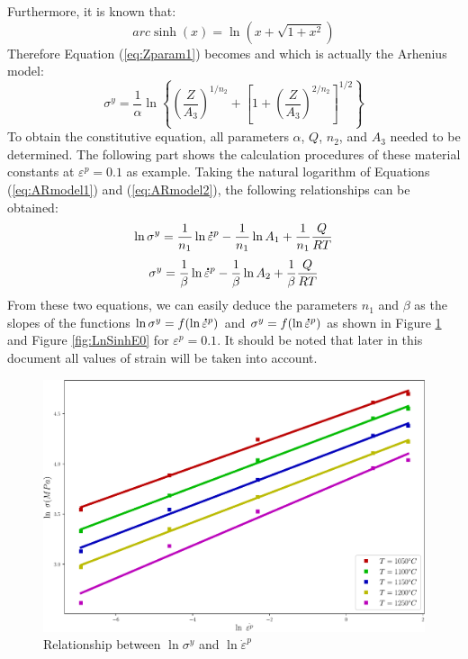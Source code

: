 \documentclass[twoside,english,1p,final,sort&compress]{elsarticle}
\theoremstyle{plain}
\newcommand{\mdot}[1]{\accentset{\mbox{\bfseries .}}{#1}}
\begin{document}
Furthermore, it is known that:
\begin{equation}
arc\sinh(x) = \ln\left(x + \sqrt{1+x^2}\right)
\end{equation}
Therefore Equation (\ref{eq:Zparam1}) becomes and which is actually the Arhenius model:
\begin{equation}
\sigma^y = \frac{1}{\alpha}\ln\left\{\left(\frac{Z}{A_3}\right)^{1/n_2} + \left[1 + \left(\frac{Z}{A_3}\right)^{2/n_2}\right]^{1/2}\right\}
\end{equation}
To obtain the constitutive equation, all parameters $\alpha$, $Q$, $n_2$, and $A_3$ needed to be determined. The following part shows the calculation procedures of these material constants at $\varepsilon^p = 0.1$ as example. Taking the natural logarithm of Equations (\ref{eq:ARmodel1}) and (\ref{eq:ARmodel2}), the following relationships can be obtained:
\begin{equation}
\ln \sigma^y = \frac{1}{n_1}\ln \mdot\varepsilon^p -\frac{1}{n_1}\ln A_1 +  \frac{1}{n_1}\frac{Q}{RT}
\end{equation}
\begin{equation}
\sigma^y = \frac{1}{\beta}\ln \mdot\varepsilon^p - \frac{1}{\beta}\ln A_2 + \frac{1}{\beta}\frac{Q}{RT}
\end{equation}
From these two equations, we can easily deduce the parameters $n_1$ and $\beta$ as the slopes of the functions $\ln\sigma^y = f(\ln\mdot\varepsilon^p)$  and $\sigma^y = f(\ln\mdot\varepsilon^p)$ as shown in Figure \ref{fig:LnAlp} and Figure \ref{fig:LnSinhE0} for $\varepsilon^p = 0.1$. It should be noted that later in this document all values of strain will be taken into account.
\begin{figure}[!ht]
\centering
\includegraphics[width=0.9\columnwidth]{Figures/LnAlp}
\caption{Relationship between $\ln \sigma^y$ and $\ln \dot{\varepsilon}^p$}
\label{fig:LnAlp}
\end{figure}
\end{document}
